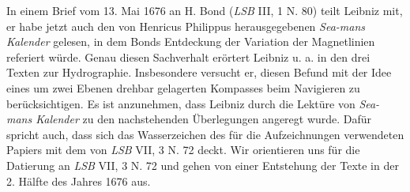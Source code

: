\pstart In einem Brief vom 13. Mai 1676 an H. Bond\protect{} (\textit{LSB} III, 1 N. 80) teilt Leibniz mit, er habe jetzt auch den von Henricus Philippus\protect{} herausgegebenen \cite{00002}\textit{Sea-mans Kalender} gelesen, in dem Bonds\protect{} Entdeckung der Variation der Magnetlinien referiert w\"{u}rde. Genau diesen Sachverhalt er\"{o}rtert Leibniz u. a. in den drei Texten zur Hydrographie. Insbesondere versucht er, diesen Befund mit der Idee eines um zwei Ebenen drehbar gelagerten Kompasses beim Navigieren zu ber\"{u}cksichtigen. Es ist anzunehmen, dass Leibniz durch die Lekt\"{u}re von \cite{00002}\textit{Sea-mans Kalender} zu den nachstehenden \"{U}berlegungen angeregt wurde. Daf\"{u}r spricht auch, dass sich das Wasserzeichen des f\"{u}r die Aufzeichnungen verwendeten Papiers mit dem von \textit{LSB} VII, 3 N. 72 deckt. Wir orientieren uns f\"{u}r die Datierung an \textit{LSB} VII, 3 N. 72 und gehen von einer Entstehung der Texte in der 2. H\"{a}lfte des Jahres 1676 aus.\pend